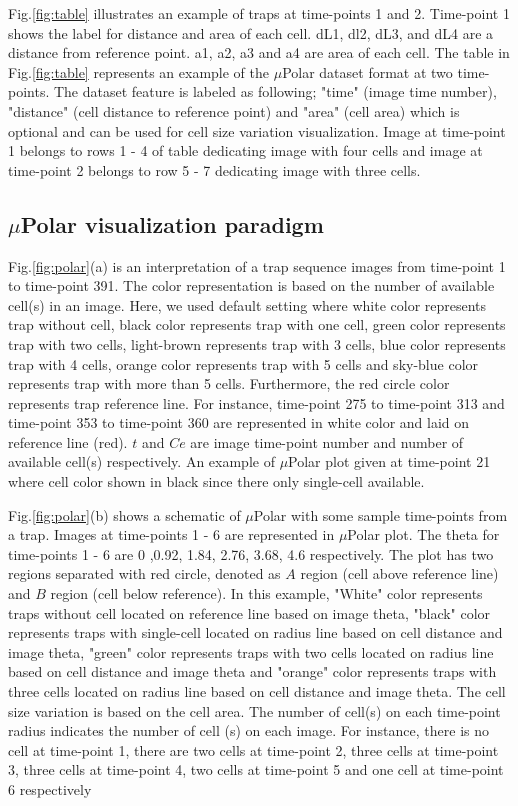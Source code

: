 \documentclass[conference]{IEEEtran}
\begin{document}
Fig.\ref{fig:table} illustrates an example of traps at time-points 1 and 2. Time-point 1 shows the label for distance and area of each cell. dL1, dl2, dL3, and dL4 are a distance from reference point. a1, a2, a3 and a4 are area of each cell. The table in Fig.\ref{fig:table} represents an example of the $\mu$Polar dataset format at two time-points. The dataset feature is labeled as following; "time" (image time number), "distance" (cell distance to reference point) and "area" (cell area)  which is optional and can be used for cell size variation visualization. Image at time-point 1 belongs to rows 1 - 4 of table dedicating image with four cells and image at time-point 2 belongs to row 5 - 7 dedicating image with three cells.



\subsection{$\mu$Polar visualization paradigm}

Fig.\ref{fig:polar}(a) is an interpretation of a trap sequence images from time-point 1 to time-point 391. The color representation is based on the number of available cell(s) in an image. Here, we used default setting where white color represents trap without cell, black color represents trap with one cell, green color represents trap with two cells, light-brown represents trap with 3 cells, blue color represents trap with 4 cells, orange color represents trap with 5 cells and sky-blue color represents trap with more than 5 cells. Furthermore, the red circle color represents trap reference line. For instance, time-point 275 to time-point 313 and time-point 353 to time-point 360 are represented in white color and laid on reference line (red). $ t  $ and  $ Ce $  are image time-point number and number of available cell(s) respectively. An example of $\mu$Polar plot given at time-point 21 where cell color shown in black since there only single-cell available. 

Fig.\ref{fig:polar}(b) shows a schematic of $\mu$Polar with some sample time-points from a trap. Images at time-points 1 - 6 are represented in $\mu$Polar plot. The theta for time-points 1 - 6 are 0 ,0.92, 1.84, 2.76, 3.68, 4.6 respectively. The plot has two regions separated with red circle, denoted as $ A $ region (cell above reference line) and $ B $ region (cell below reference). In this example, "White" color represents traps without cell located on reference line based on image theta, "black" color represents traps with single-cell located on radius line based on cell distance and image theta, "green" color represents traps with two cells located on radius line based on cell distance and image theta and "orange" color represents traps with three cells located on radius line based on cell distance and image theta. The cell size variation is based on the cell area. The number of cell(s) on each time-point radius indicates the number of cell (s) on each image. For instance, there is no cell at time-point 1, there are two cells at time-point 2, three cells at time-point 3, three cells at time-point 4, two cells at time-point 5 and one cell at time-point 6 respectively
\end{document}
